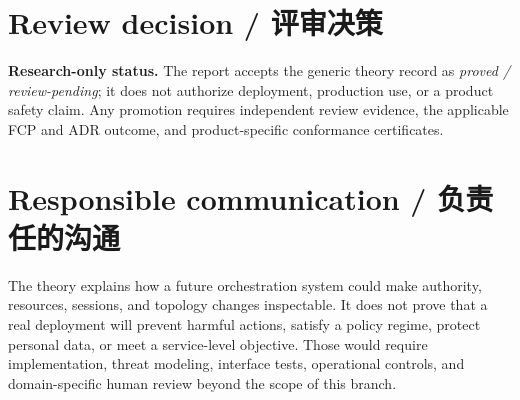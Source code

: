 \section{Review decision / 评审决策}

\begin{MWDecision}
\textbf{Research-only status.} The report accepts the generic theory record as \emph{proved /
review-pending}; it does not authorize deployment, production use, or a product safety claim.
Any promotion requires independent review evidence, the applicable FCP and ADR outcome, and
product-specific conformance certificates.
\end{MWDecision}

\section{Responsible communication / 负责任的沟通}

The theory explains how a future orchestration system could make authority, resources, sessions,
and topology changes inspectable. It does not prove that a real deployment will prevent harmful
actions, satisfy a policy regime, protect personal data, or meet a service-level objective.
Those would require implementation, threat modeling, interface tests, operational controls, and
domain-specific human review beyond the scope of this branch.
